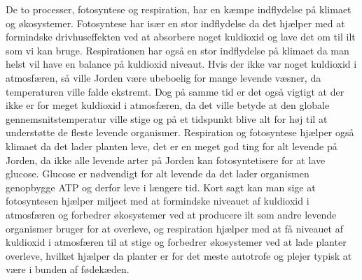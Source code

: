 De to processer, fotosyntese og respiration, har en kæmpe indflydelse på klimaet og økosystemer. Fotosyntese har især en stor indflydelse da det hjælper med at formindske drivhuseffekten ved at absorbere noget kuldioxid og lave det om til ilt som vi kan bruge. Respirationen har også en stor indflydelse på klimaet da man helst vil have en balance på kuldioxid niveaut. Hvis der ikke var noget kuldioxid i atmosfæren, så ville Jorden være ubeboelig for mange levende væsner, da temperaturen ville falde ekstremt. Dog på samme tid er det også vigtigt at der ikke er for meget kuldioxid i atmosfæren, da det ville betyde at den globale gennemsnitstemperatur ville stige og på et tidspunkt blive alt for høj til at understøtte de fleste levende organismer. Respiration og fotosyntese hjælper også klimaet da det lader planten leve, det er en meget god ting for alt levende på Jorden, da ikke alle levende arter på Jorden kan fotosyntetisere for at lave glucose. Glucose er nødvendigt for alt levende da det lader organismen genopbygge ATP og derfor leve i længere tid.
Kort sagt kan man sige at fotosyntesen hjælper miljøet med at formindske niveauet af kuldioxid i atmosfæren og forbedrer økosystemer ved at producere ilt som andre levende organismer bruger for at overleve, og respiration hjælper med at få niveauet af kuldioxid i atmosfæren til at stige og forbedrer økosystemer ved at lade planter overleve, hvilket hjælper da planter er for det meste autotrofe og plejer typisk at være i bunden af fødekæden.

